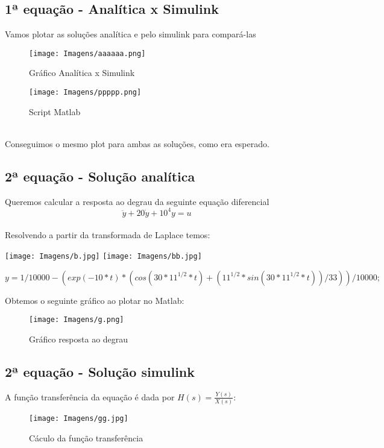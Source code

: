 \documentclass[a4paper, 12pt]{article}
\begin{document}
\subsection{1ª equação - Analítica x Simulink}
	Vamos plotar as soluções analítica e pelo simulink para compará-las
	\begin{figure}[h]
		\centering
		\texttt{[image: Imagens/aaaaaa.png]}
		\caption{Gráfico Analítica x Simulink}
	\end{figure}
	\begin{figure}[h]
		\centering
		\texttt{[image: Imagens/ppppp.png]}
		\caption{Script Matlab}
	\end{figure}
	\\Conseguimos o mesmo plot para ambas as soluções, como era esperado.
	

\newpage
\subsection{2ª equação - Solução analítica}
Queremos calcular a resposta ao degrau da seguinte equação diferencial
	\begin{equation}
		\ddot{y} + 20\dot{y} + 10^4y = u
	\end{equation}
	\\Resolvendo a partir da transformada de Laplace temos:
		\begin{center}
			\texttt{[image: Imagens/b.jpg]}
			\texttt{[image: Imagens/bb.jpg]}
		\end{center}
		
	\begin{equation}
		y = 1/10000 - (exp(-10*t)*(cos(30*11^{1/2}*t) + (11^{1/2}*sin(30*11^{1/2}*t))/33))/10000;
	\end{equation}		
		
		
	Obtemos o seguinte gráfico ao plotar no Matlab:
	\begin{figure}[h]
		\center
		\texttt{[image: Imagens/g.png]}
		\caption{Gráfico resposta ao degrau}
	\end{figure}
	
	
	\newpage
\subsection{2ª equação - Solução simulink}
	A função transferência da equação é dada por $H(s) = \frac{Y(s)}{X(s)}$:
	\begin{figure}[h]
		\center
		\texttt{[image: Imagens/gg.jpg]}
		\caption{Cáculo da função transferência}
	\end{figure}
	
\end{document}
